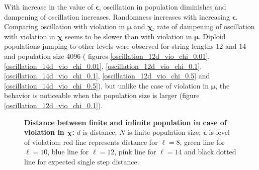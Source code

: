 With increase in the value of $\bm{\epsilon}$, 
oscillation in population diminishes and dampening of oscillation increases. 
Randomness increases with increasing $\bm{\epsilon}$.
Comparing oscillation with violation in $\bm{\mu}$ and $\bm{\chi}$, rate of dampening of oscillation with violation 
in $\bm{\chi}$ seems to be slower than with violation in ${\bm{\mu}}$. 
Diploid populations jumping to other levels 
were observed for string lengths 12 and 14 and population size 4096  ( 
figures \ref{oscillation_12d_vio_chi_0.01}, \ref{oscillation_14d_vio_chi_0.01}, \ref{oscillation_12d_vio_chi_0.1}, 
\ref{oscillation_14d_vio_chi_0.1}, \ref{oscillation_12d_vio_chi_0.5} and \ref{oscillation_14d_vio_chi_0.5}), 
but unlike the case of violation in $\bm{\mu}$, 
the behavior is noticeable when the population size is larger (figure \ref{oscillation_12d_vio_chi_0.1}). 



\begin{figure}[!ht]
\begin{center}
\hspace{-3em}%
\caption[\textbf{Distance between finite and infinite population in case of violation in $\bm{\chi}$}]{\textbf{Distance between finite and infinite population in case of violation in $\bm{\chi}$:}  
  $d$ is distance; $N$ is finite population size; $\bm{\epsilon}$ is level of violation; 
  red line represents distance for $\ell = 8$, green line for $\ell = 10$, blue line for $\ell = 12$, pink line for $\ell = 14$ 
  and black dotted line for expected single step distance.}
\label{vio_chi_dist}
\end{center}
\end{figure}

